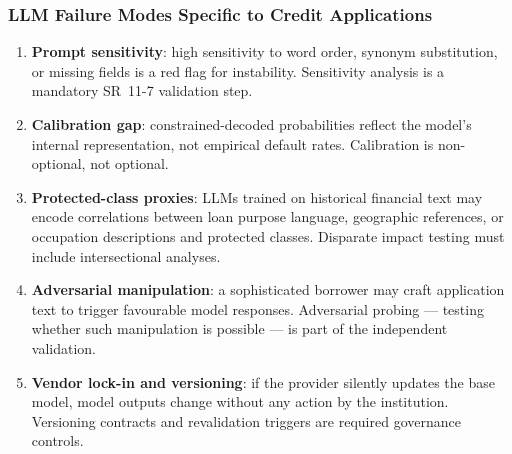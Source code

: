 \documentclass[9pt,t]{beamer}
\begin{document}
\begin{frame}
\frametitle{LLM Failure Modes Specific to Credit Applications}

\begin{enumerate}
  \item \textbf{Prompt sensitivity}: high sensitivity to word order, synonym substitution, or missing fields is a red flag for instability. Sensitivity analysis is a mandatory SR~11-7 validation step.

  \item \textbf{Calibration gap}: constrained-decoded probabilities reflect the model's internal representation, not empirical default rates. Calibration is non-optional, not optional.

  \item \textbf{Protected-class proxies}: LLMs trained on historical financial text may encode correlations between loan purpose language, geographic references, or occupation descriptions and protected classes. Disparate impact testing must include intersectional analyses.

  \item \textbf{Adversarial manipulation}: a sophisticated borrower may craft application text to trigger favourable model responses. Adversarial probing --- testing whether such manipulation is possible --- is part of the independent validation.

  \item \textbf{Vendor lock-in and versioning}: if the provider silently updates the base model, model outputs change without any action by the institution. Versioning contracts and revalidation triggers are required governance controls.
\end{enumerate}
\end{frame}
\end{document}
